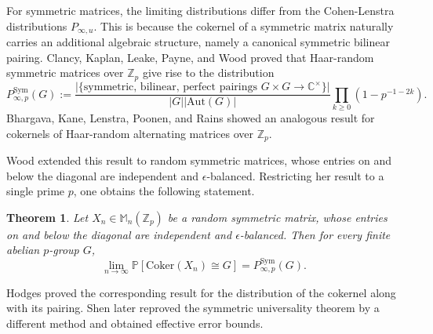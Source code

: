 \documentclass[12pt]{amsart}
\newtheorem{theorem}{Theorem}[section]
\theoremstyle{definition}
\newcommand{\PPP}{\mathbb{P}}
\newcommand{\abs}[1]{\vert#1\vert}
\newcommand{\Sym}{\text{Sym}}
\newcommand{\msympinf}{P^{\Sym}_{\infty,p}}
\newcommand{\C}{\mathbb{C}}
\newcommand{\Zp}{\Z_p}
\newcommand{\Z}{\mathbb{Z}}
\newcommand{\Coker}{\text{Coker}}
\newcommand{\Aut}{\text{Aut}}
\begin{document}
For symmetric matrices, the limiting distributions differ from the Cohen-Lenstra distributions $P_{\infty,u}$. This is because the cokernel of a symmetric matrix naturally carries an additional algebraic structure, namely a canonical symmetric bilinear pairing.
Clancy, Kaplan, Leake, Payne, and Wood \cite{clancy2015cohen} proved that Haar-random symmetric matrices over $\Zp$ give rise to the distribution
\[
\msympinf(G)
:=\frac{\abs{\{\text{symmetric, bilinear, perfect pairings }G\times G\to \C^{\times}\}}}{\abs{G}\abs{\Aut(G)}}
\prod_{k\geq 0}(1-p^{-1-2k}).
\]
Bhargava, Kane, Lenstra, Poonen, and Rains \cite{bhargava2015modeling} showed an analogous result for cokernels of Haar-random alternating matrices over $\Zp$.




Wood \cite{wood2017distribution} extended this result to random symmetric matrices, whose entries on and below the diagonal are independent and $\epsilon$-balanced.
Restricting her result to a single prime $p$, one obtains the following statement.

\begin{theorem}\cite{wood2017distribution}\label{Thm: Wood dist of sym matrix coker}
Let $X_n\in\mathbb{M}_n(\Zp)$ be a random symmetric matrix, whose entries on and below the diagonal are independent and $\epsilon$-balanced. Then for every finite abelian $p$-group $G$,
\[
\lim_{n\to\infty}
\PPP[\Coker(X_n)\cong G]
=
\msympinf(G).
\]
\end{theorem}


Hodges \cite{hodges2024distribution} proved the corresponding result for the distribution of the cokernel along with its pairing.
Shen \cite{shen2026quantative} later reproved the symmetric universality theorem by a different method and obtained effective error bounds.
\end{document}
